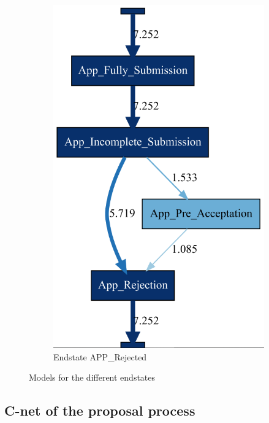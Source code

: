 \begin{figure}[!htbp]
\begin{subfigure}{.3\textwidth}
\includegraphics[width=\linewidth]{Rej0-1.PNG}
\caption{Endstate APP\_Rejected}
\label{fig:RejModel}
\end{subfigure}
\caption{Models for the different endstates}
\end{figure}

\subsection{C-net of the proposal process}

